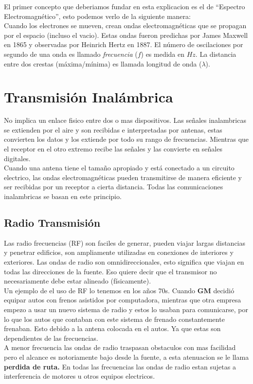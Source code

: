 El primer concepto que deberiamos fundar en esta explicacion es el de ``Espectro Electromagnético'', esto podemos verlo de la siguiente manera:  \\${ }$\\
Cuando los electrones se mueven, crean ondas electromagnéticas que se propagan por el espacio (incluso el vacio). Estas ondas fueron predichas por James Maxwell en 1865 y observadas por Heinrich Hertz en 1887. El número de oscilaciones por segundo de una onda es llamado \textit{frecuencia} ($f$) es medida en $Hz.$ La distancia entre dos crestas (máxima/mínima) es llamada longitud de onda ($\lambda$).


\section*{Transmisión Inalámbrica}
No implica un enlace fisico entre dos o mas dispositivos. Las señales inalambricas se extienden por el aire y son recibidas e interpretadas por antenas, estas convierten los datos y los extiende por todo su rango de frecuencias. Mientras que el receptor en el otro extremo recibe las señales y las convierte en señales digitales. \\ ${ }$\\
Cuando una antena tiene el tamaño apropiado y está conectado a un circuito electrico, las ondas electromagnéticas pueden transmitirse de manera eficiente y ser recibidas por un receptor a cierta distancia. Todas las comunicaciones inalambricas se basan en este principio.
\subsection*{Radio Transmisión}
Las radio frecuencias (RF) son faciles de generar, pueden viajar largas distancias y penetrar edificios, son ampliamente utilizadas en conexiones de interiores y exteriores. Las ondas de radio son omnidireccionales, esto significa que viajan en todas las direcciones de la fuente. Eso quiere decir que el transmisor no necesariamente debe estar alineado (físicamente). 
\\ Un ejemplo de el uso de RF lo tenemos en los años 70s. Cuando \textbf{GM} decidió equipar autos con frenos asistidos por computadora, mientras que otra empresa empezo a usar un nuevo sistema de radio y estos lo usaban para comunicarse, por lo que los autos que contaban con este sistema de frenado constantemente frenaban. Esto debido a la antena colocada en el autos. Ya que estas son dependientes de las frecuencias. \\ ${ }$ \\
A menor frecuencia las ondas de radio traspasan obstaculos con mas facilidad pero el alcance es notoriamente bajo desde la fuente, a esta atenuacion se le llama \textbf{perdida de ruta.} En todas las frecuencias las ondas de radio estan sujetas a interferencia de motores u otros equipos electricos.

